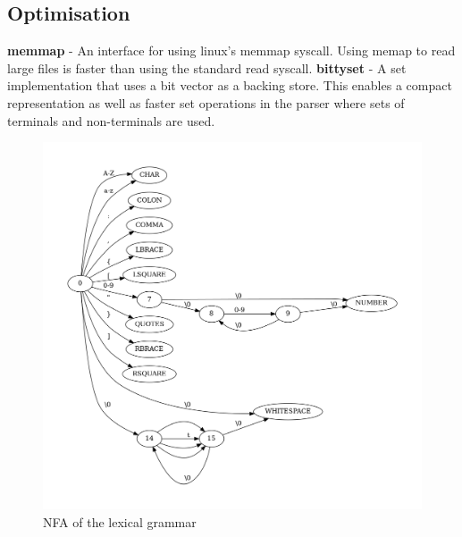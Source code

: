 \subsection{Optimisation}
\textbf{memmap} - An interface for using linux's memmap syscall. Using memap to
read large files is  faster than using the standard read syscall.
\newline\newline
\textbf{bittyset} - A set implementation that uses a bit vector as a backing
store. This enables a compact representation as well as faster set operations in
the parser where sets of terminals and non-terminals are used.

\begin{figure}[t]
\includegraphics[width=\linewidth]{images/nfa.png}
\caption{NFA of the lexical grammar}
\label{fig:nfa}
\end{figure}

